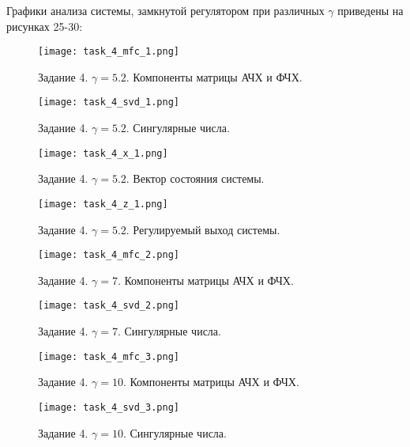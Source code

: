 Графики анализа системы, замкнутой регулятором при различных $\gamma$ приведены на рисунках 25-30:

\begin{figure}[]
    \centering
    \texttt{[image: task\_4\_mfc\_1.png]}
    \caption{\label{fig:task4_1_1}Задание 4. $\gamma = 5.2$. Компоненты матрицы АЧХ и ФЧХ.}
\end{figure}

\begin{figure}[]
    \centering
    \texttt{[image: task\_4\_svd\_1.png]}
    \caption{\label{fig:task4_1_2}Задание 4. $\gamma = 5.2$. Сингулярные числа.}
\end{figure}

\begin{figure}[]
    \centering
    \texttt{[image: task\_4\_x\_1.png]}
    \caption{\label{fig:task4_1_3}Задание 4. $\gamma = 5.2$. Вектор состояния системы.}
\end{figure}

\begin{figure}[]
    \centering
    \texttt{[image: task\_4\_z\_1.png]}
    \caption{\label{fig:task4_1_4}Задание 4. $\gamma = 5.2$. Регулируемый выход системы.}
\end{figure}

\begin{figure}[]
    \centering
    \texttt{[image: task\_4\_mfc\_2.png]}
    \caption{\label{fig:task4_2_1}Задание 4. $\gamma = 7$. Компоненты матрицы АЧХ и ФЧХ.}
\end{figure}

\begin{figure}[]
    \centering
    \texttt{[image: task\_4\_svd\_2.png]}
    \caption{\label{fig:task4_2_2}Задание 4. $\gamma = 7$. Сингулярные числа.}
\end{figure}

\begin{figure}[]
    \centering
    \texttt{[image: task\_4\_mfc\_3.png]}
    \caption{\label{fig:task4_3_1}Задание 4. $\gamma = 10$. Компоненты матрицы АЧХ и ФЧХ.}
\end{figure}

\begin{figure}[]
    \centering
    \texttt{[image: task\_4\_svd\_3.png]}
    \caption{\label{fig:task4_3_2}Задание 4. $\gamma = 10$. Сингулярные числа.}
\end{figure}

\pagebreak

